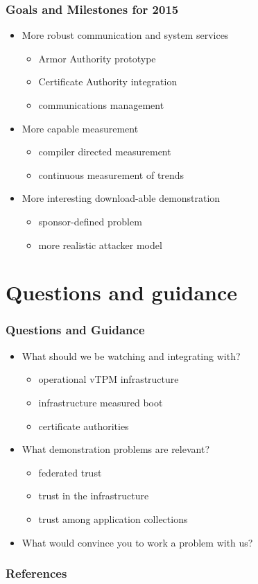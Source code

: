 \documentclass{beamer}
\begin{document}
\begin{frame}
  \frametitle{Goals and Milestones for 2015}

  \begin{itemize}
  \item More robust communication and system services
    \begin{itemize}
    \item Armor Authority prototype
    \item Certificate Authority integration
    \item communications management
    \end{itemize}
  \item More capable measurement
    \begin{itemize}
    \item compiler directed measurement
    \item continuous measurement of trends
    \end{itemize}
  \item More interesting download-able demonstration
    \begin{itemize}
    \item sponsor-defined problem
    \item more realistic attacker model
    \end{itemize}
  \end{itemize}
\end{frame}

\section{Questions and guidance}

\begin{frame}
  \frametitle{Questions and Guidance}

  \begin{itemize}
  \item What should we be watching and integrating with?
    \begin{itemize}
    \item operational vTPM infrastructure
    \item infrastructure measured boot
    \item certificate authorities
    \end{itemize}
  \item What demonstration problems are relevant?
    \begin{itemize}
    \item federated trust
    \item trust in the infrastructure
    \item trust among application collections
    \end{itemize}
  \item What would convince you to work a problem with us?
  \end{itemize}
\end{frame}

\nocite{Coker::Principles-of-R,Haldar:04:Semantic-Remote,Fabrega:1999aa,Ryan:09:Introduction-to}

\begin{frame}
  \frametitle{References}
  
\end{frame}
\end{document}
